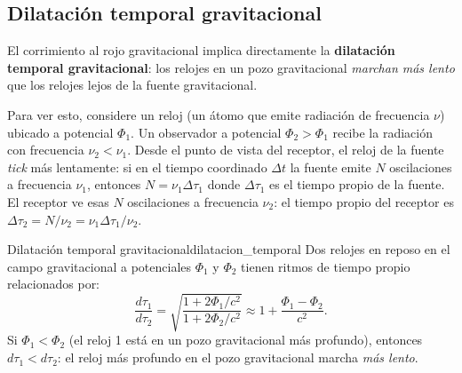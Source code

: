 \subsection{Dilatación temporal gravitacional}

El corrimiento al rojo gravitacional implica directamente la \textbf{dilatación temporal gravitacional}: los relojes en un pozo gravitacional \emph{marchan más lento} que los relojes lejos de la fuente gravitacional.

Para ver esto, considere un reloj (un átomo que emite radiación de frecuencia $\nu$) ubicado a potencial $\Phi_1$. Un observador a potencial $\Phi_2 > \Phi_1$ recibe la radiación con frecuencia $\nu_2 < \nu_1$. Desde el punto de vista del receptor, el reloj de la fuente \emph{tick} más lentamente: si en el tiempo coordinado $\Delta t$ la fuente emite $N$ oscilaciones a frecuencia $\nu_1$, entonces $N = \nu_1 \Delta\tau_1$ donde $\Delta\tau_1$ es el tiempo propio de la fuente. El receptor ve esas $N$ oscilaciones a frecuencia $\nu_2$: el tiempo propio del receptor es $\Delta\tau_2 = N/\nu_2 = \nu_1\Delta\tau_1/\nu_2$.

\begin{proposicion}{Dilatación temporal gravitacional}{dilatacion_temporal}
Dos relojes en reposo en el campo gravitacional a potenciales $\Phi_1$ y $\Phi_2$ tienen ritmos de tiempo propio relacionados por:
\begin{equation}
  \frac{d\tau_1}{d\tau_2} = \sqrt{\frac{1 + 2\Phi_1/c^2}{1 + 2\Phi_2/c^2}}
  \approx 1 + \frac{\Phi_1 - \Phi_2}{c^2}.
  \label{eq:dilatacion_temporal_grav}
\end{equation}
Si $\Phi_1 < \Phi_2$ (el reloj 1 está en un pozo gravitacional más profundo), entonces $d\tau_1 < d\tau_2$: el reloj más profundo en el pozo gravitacional marcha \emph{más lento}.
\end{proposicion}

